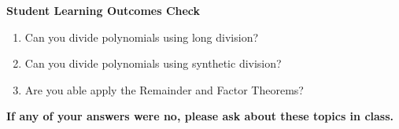 \documentclass[11pt]{article}
\begin{document}
\noindent \textbf{Student Learning Outcomes Check}

\begin{enumerate}
\item Can you divide polynomials using long division?
\item Can you divide polynomials using synthetic division?
\item Are you able apply the Remainder and Factor Theorems?

\end{enumerate}

\noindent \textbf{If any of your answers were no, please ask about these topics in class.}
\end{document}
